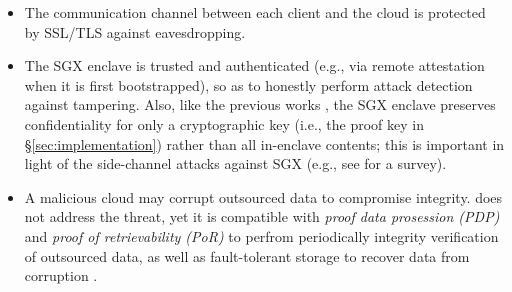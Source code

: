 \begin{itemize}[leftmargin=*]
\item The communication channel between each client and the cloud is protected by SSL/TLS against eavesdropping.
\item
  The SGX enclave is trusted and authenticated (e.g., via remote attestation when it is first bootstrapped), so as to honestly perform attack detection against tampering. Also, like the previous works \cite{shinde20, ren21}, the SGX enclave preserves confidentiality for only a cryptographic key (i.e., the proof key in \S\ref{sec:implementation}) rather than all in-enclave contents; this is important in light of the side-channel attacks against SGX (e.g., see \cite{fei21} for a survey).

\item A malicious cloud may corrupt outsourced data to compromise integrity. \sysnameF does not address the threat, yet it is compatible with {\em proof data prosession (PDP)} \cite{ateniese07} and {\em proof of retrievability (PoR)} \cite{juels07} to perfrom periodically integrity verification of outsourced data, as well as fault-tolerant storage to recover data from corruption \cite{li15}.
\end{itemize}
